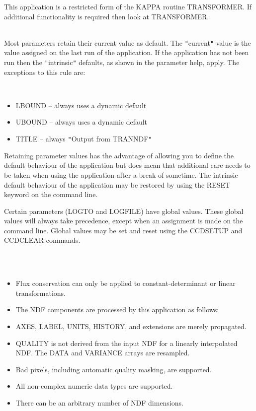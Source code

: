 \documentclass[twoside,11pt]{article}
\newcommand{\htmlref}[2]{#1}
\newcommand{\xref}[3]{#1}
\renewcommand{\_}{\texttt{\symbol{95}}}
\newcommand{\qt}[1]{{\tt "}#1{\tt "}}
\newcommand{\xroutine}[1]{\htmlref{{\sc #1}}{#1}}
\newcommand{\sstdiytopic}[2]{\item[#1:] \mbox{} \\[1.3ex] #2}
\newcommand{\sstimplementationstatus}[1]{
   \item[{Implementation Status:}] \mbox{} \\[1.3ex] #1}
\newcommand{\sstitemlist}[1]{
  \mbox{} \\
  \vspace{-3.5ex}
  \begin{itemize}
     #1
  \end{itemize}
}
\newcommand{\sstitem}{\item}
\newcommand{\sstdiytopic}[2]{\item[{#1}] #2 }
\newcommand{\sstimplementationstatus}[1]{
      \item[Implementation Status:] #1
   }
\newcommand{\sstitemlist}[1]{
      \begin{itemize}
         #1
      \end{itemize}
      \\
   }
\newcommand{\sstitem}{\item}
\begin{document}
{{{         \sstitem
         This application is a restricted form of the KAPPA routine
           \xref{TRANSFORMER}{sun95}{TRANSFORMER}. If additional
           functionality is required then look at TRANSFORMER.
      }
   }
   \sstdiytopic{
      Behaviour of parameters
   }{
      Most parameters retain their current value as default. The
      \qt{current} value is the value assigned on the last run of the
      application. If the application has not been run then the
      \qt{intrinsic} defaults, as shown in the parameter help, apply.
      The exceptions to this rule are:
      \sstitemlist{

         \sstitem
            LBOUND  -- always uses a dynamic default

         \sstitem
            UBOUND  -- always uses a dynamic default

         \sstitem
            TITLE   -- always \qt{Output from TRANNDF}

      }
      Retaining parameter values has the advantage of allowing you to
      define the default behaviour of the application but does mean
      that additional care needs to be taken when using the application
      after a break of sometime. The intrinsic default behaviour of
      the application may be restored by using the RESET keyword on
      the command line.

      Certain parameters (LOGTO and LOGFILE) have global values. These
      global values will always take precedence, except when an
      assignment is made on the command line.  Global values may be set
      and reset using the \xroutine{CCDSETUP} and \xroutine{CCDCLEAR} commands.
   }
\newpage

   \sstimplementationstatus{
      \sstitemlist{

         \sstitem
         Flux conservation can only be applied to constant-determinant
           or linear transformations.

         \sstitem
         The NDF components are processed by this application as
           follows:

         \sstitem
            AXES, LABEL, UNITS, HISTORY, and extensions are merely
               propagated.

         \sstitem
            QUALITY is not derived from the input NDF for a linearly
               interpolated NDF. The DATA and VARIANCE arrays are
               resampled.

         \sstitem
         Bad pixels, including automatic quality masking, are supported.

         \sstitem
         All non-complex numeric data types are supported.

         \sstitem
         There can be an arbitrary number of NDF dimensions.
      }
   }
}
\end{document}
